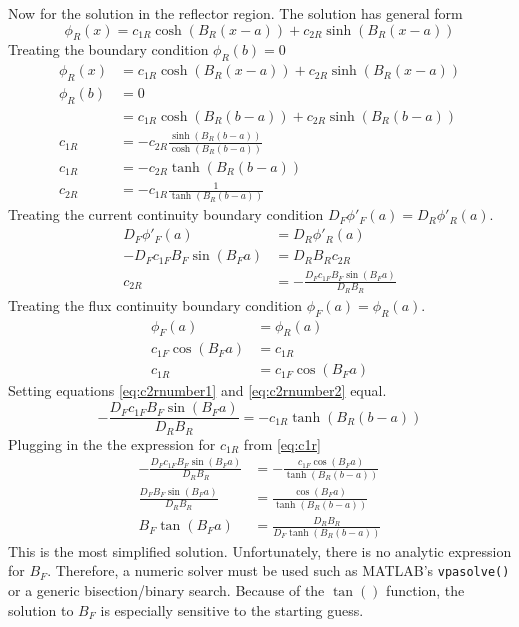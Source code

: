 \documentclass{article}
\begin{document}
  Now for the solution in the reflector region. The solution has general form
  \begin{equation}
    \phi_R(x) = c_{1R} \cosh(B_R (x-a)) + c_{2R} \sinh(B_R (x-a))
  \end{equation}
  Treating the boundary condition $\phi_R(b)=0$
  \begin{align}
    \phi_R(x) &= c_{1R} \cosh(B_R (x-a)) + c_{2R} \sinh(B_R (x-a))\\
    \phi_R(b) &= 0 \\
    &= c_{1R} \cosh(B_R(b-a)) + c_{2R} \sinh(B_R(b-a))\\
    c_{1R} &= -c_{2R} \frac{\sinh(B_R(b-a))}{\cosh(B_R(b-a))}\\
    c_{1R} &= -c_{2R} \tanh(B_R(b-a))\\
    c_{2R} &= -c_{1R} \frac{1}{\tanh(B_R(b-a))} \label{eq:c2rnumber1}
  \end{align}
  Treating the current continuity boundary condition
  $D_F \phi'_F(a) = D_R \phi'_R(a)$.
  \begin{align}
    D_F \phi'_F(a) &= D_R \phi'_R(a) \\
    -D_F c_{1F} B_F \sin(B_F a) &= D_R B_R c_{2R} \\
    c_{2R} &= -\frac{D_F c_{1F} B_F \sin(B_F a)}{D_R B_R} \label{eq:c2rnumber2}
  \end{align}
  Treating the flux continuity boundary condition $\phi_F(a)=\phi_R(a)$.
  \begin{align}
    \phi_F(a)&=\phi_R(a) \\
    c_{1F} \cos(B_F a) &= c_{1R} \\
    c_{1R} &= c_{1F} \cos(B_F a) \label{eq:c1r}
  \end{align}
  Setting equations \eqref{eq:c2rnumber1} and \eqref{eq:c2rnumber2} equal.
  \begin{equation}
    - \frac{D_F c_{1F} B_F \sin(B_F a)}{D_R B_R} = -c_{1R} \tanh(B_R(b-a))
  \end{equation}
  Plugging in the the expression for $c_{1R}$ from \eqref{eq:c1r}
  \begin{align}
    - \frac{D_F c_{1F} B_F \sin(B_F a)}{D_R B_R} &=
      - \frac{c_{1F} \cos(B_F a)}{\tanh(B_R(b-a))}\\
    \frac{D_F B_F \sin(B_F a)}{D_R B_R} &= 
      \frac{\cos(B_F a)}{\tanh(B_R(b-a))} \\
    B_F \tan(B_F a) &= \frac{D_R B_R}{D_F \tanh(B_R(b-a))}
  \end{align}
  This is the most simplified solution. Unfortunately, there is no analytic
  expression for $B_F$. Therefore, a numeric solver must be used such as 
  MATLAB's \verb|vpasolve()| or a generic bisection/binary search. Because of
  the $\tan()$ function, the solution to $B_F$ is especially sensitive to the
  starting guess.
  
\end{document}
